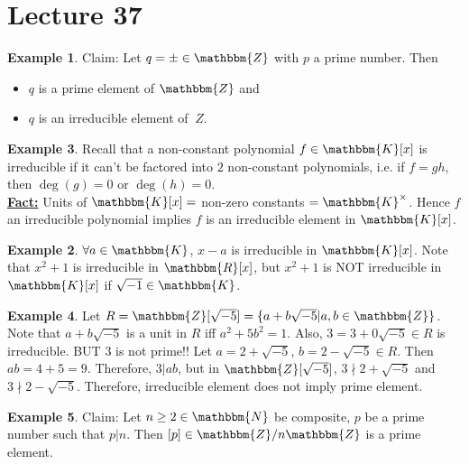 \documentclass{article}
\newcommand{\N}{\mathbbm{N}}
\newcommand{\Z}{\mathbbm{Z}}
\newcommand{\R}{\mathbbm{R}}
\newcommand{\define}[1]{\textbf{\underline{#1}}}
\theoremstyle{definition}
\newtheorem*{ex}{Example}
\theoremstyle{remark}
\newcommand{\K}{\mathbbm{K}}
\begin{document}
    \section*{Lecture 37}{
        \begin{ex}
            Claim: Let $q=\pm \in \Z$ with $p$ a prime number. Then
            \begin{itemize}
                \item $q$ is a prime element of $\Z$ and
                \item $q$ is an irreducible element of $\
                Z$.
            \end{itemize}
        \end{ex}
        
        \begin{ex}
            Recall that a non-constant polynomial $f \in \K[x]$ is irreducible if it can't be factored into $2$ non-constant polynomials, i.e. if $f=gh$, then $\deg(g)=0$ or $\deg(h)=0$.\\
            \define{Fact:} Units of $\K[x]=$ non-zero constants $=\K^\times$. Hence $f$ an irreducible polynomial implies $f$ is an irreducible element in $\K[x]$.
            \begin{ex}
                $\forall a\in \K$, $x-a$ is irreducible in $\K[x]$. Note that $x^2+1$ is irreducible in $\R[x]$, but $x^2+1$ is NOT irreducible in $\K[x]$ if $\sqrt{-1}\in \K$.
            \end{ex}
        \end{ex}
        
        \begin{ex}
            Let $R=\Z[\sqrt{-5}]=\{a+b\sqrt{-5}|a,b \in \Z\}$. Note that $a+b\sqrt{-5}$ is a unit in $R$ iff $a^2+5b^2=1$. Also, $3=3+0\sqrt{-5}\in R$ is irreducible. BUT $3$ is not prime!! Let $a=2+\sqrt{-5}$, $b=2-\sqrt{-5} \in R$. Then $ab=4+5=9$. Therefore, $3|ab$, but in $\Z[\sqrt{-5}]$, $3\nmid 2+\sqrt{-5}$ and $3\nmid 2-\sqrt{-5}$. Therefore, irreducible element does not imply prime element.
        \end{ex}
        
        \begin{ex}
            Claim: Let $n\geq 2 \in \N$ be composite, $p$ be a prime number such that $p|n$. Then $[p]\in \Z/n\Z$ is a prime element.
        \end{ex}
    }
\end{document}
